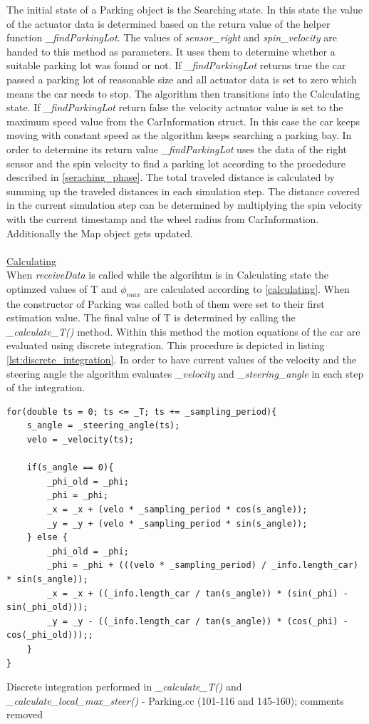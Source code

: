 \documentclass[paper=a4, fontsize=11pt]{scrreprt}
\begin{document}
The initial state of a Parking object is the Searching state. In this state the value of the actuator data is determined based on the return value of the helper function \textit{\_findParkingLot}. The values of \textit{sensor\_right} and \textit{spin\_velocity} are handed to this method as parameters. It uses them to determine whether a suitable parking lot was found or not. If \textit{\_findParkingLot} returns true the car passed a parking lot of reasonable size and all actuator data is set to zero which means the car needs to stop. The algorithm then transitions into the Calculating state. If \textit{\_findParkingLot} return false the velocity actuator value is set to the maximum speed value from the CarInformation struct. In this case the car keeps moving with constant speed as the algorithm keeps searching a parking bay. In order to determine its return value \textit{\_findParkingLot} uses the data of the right sensor and the spin velocity to find a parking lot according to the procdedure described in \ref{seraching_phase}. The total traveled distance is calculated by summing up the traveled distances in each simulation step. The distance covered in the current simulation step can be determined by multiplying the spin velocity with the current timestamp and the wheel radius from CarInformation. Additionally the Map object gets updated.\\
\\
\underline{Calculating}\\
When \textit{receiveData} is called while the algorihtm is in Calculating state the optimzed values of T and $\phi_{max}$ are calculated according to \ref{calculating}. When the constructor of Parking was called both of them were set to their first estimation value. The final value of T is determined by calling the \textit{\_calculate\_T()} method. Within this method the motion equations of the car are evaluated using discrete integration. This procedure is depicted in listing \ref{lst:discrete_integration}. In order to have current values of the velocity and the steering angle the algorithm evaluates \textit{\_velocity} and \textit{\_steering\_angle} in each step of the integration.
\begin{listing}[H]
\begin{verbatim}
for(double ts = 0; ts <= _T; ts += _sampling_period){
	s_angle = _steering_angle(ts);
    velo = _velocity(ts);

    if(s_angle == 0){
		_phi_old = _phi;
		_phi = _phi;
		_x = _x + (velo * _sampling_period * cos(s_angle));
		_y = _y + (velo * _sampling_period * sin(s_angle));
	} else {
		_phi_old = _phi;
		_phi = _phi + (((velo * _sampling_period) / _info.length_car) * sin(s_angle));
		_x = _x + ((_info.length_car / tan(s_angle)) * (sin(_phi) - sin(_phi_old)));
		_y = _y - ((_info.length_car / tan(s_angle)) * (cos(_phi) - cos(_phi_old)));;
	}
}
\end{verbatim}
\caption{Discrete integration performed in \textit{\_calculate\_T()} and \textit{\_calculate\_local\_max\_steer()} - Parking.cc (101-116 and 145-160); comments removed}
\label{lst:discrete_integration}
\end{listing}
\end{document}
